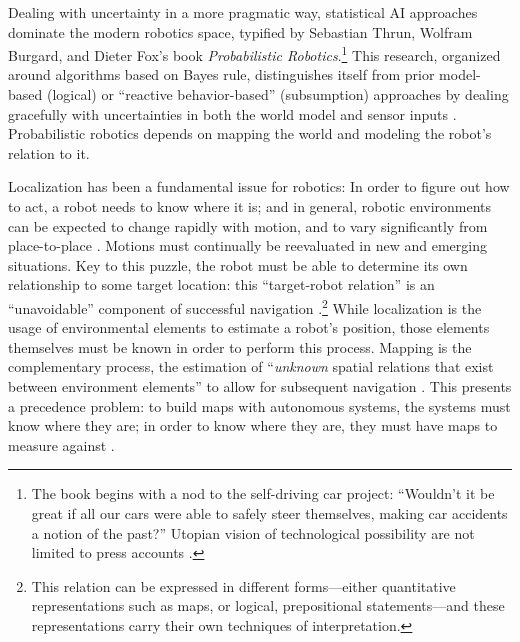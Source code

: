 
Dealing with uncertainty in a more pragmatic way, statistical AI
approaches dominate the modern robotics space, typified by Sebastian 
Thrun, Wolfram Burgard, and Dieter Fox's book
\emph{Probabilistic Robotics}.\footnote{The book begins with a nod to
  the self-driving car project: ``Wouldn't it be great if all our cars
were able to safely steer themselves, making car accidents a notion of
the past?'' Utopian vision of technological possibility are not
limited to press accounts \cite[p. 3]{thrunProb}.} This research,
organized around algorithms based on Bayes rule,
distinguishes itself from prior model-based (logical) or ``reactive
behavior-based'' (subsumption) approaches by dealing gracefully with
uncertainties in both the world model and sensor inputs \cite[p.
  9]{thrunProb}. Probabilistic robotics depends on mapping the world
and modeling the robot's relation to it.


Localization has been a fundamental issue for robotics: In order to figure out how to act, a robot
needs to know where it is; and in general, robotic environments can be
expected to change rapidly with motion, and to vary significantly from
place-to-place \cite[p. 4]{SLAMbook}. Motions must continually be reevaluated in new and
emerging situations. Key to this puzzle, the robot must be able to determine its own
relationship to some target location: this
``target-robot relation'' is an ``unavoidable'' component of successful
navigation \cite[p. 5]{SLAMbook}.\footnote{This relation can be expressed
in different forms---either quantitative representations such as maps,
or logical, prepositional statements---and these representations carry
their own techniques of interpretation.} While
localization is the usage of environmental elements to
estimate a robot's position, those elements themselves must be known
in order to perform this process. Mapping is the complementary
process, the estimation of ``\emph{unknown} spatial relations that
exist between environment elements'' to allow for subsequent
navigation \cite[p. 5]{SLAMbook}. This presents a
precedence problem:  to build maps with
autonomous systems, the systems must know where they are; in order to know
where they are, they must have maps to measure
against \cite[p. 6]{SLAMbook}.


